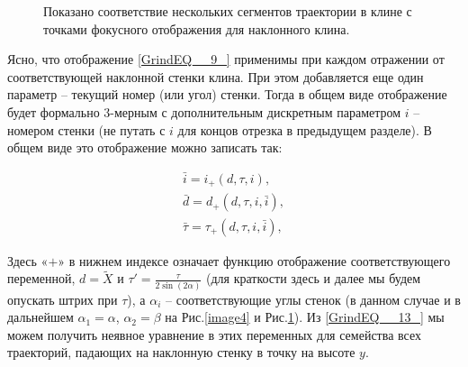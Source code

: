 \documentclass[a4paper]{article}
\begin{document}
\begin{figure}[h]
\caption{Показано соответствие нескольких сегментов траектории в клине с точками фокусного отображения для наклонного клина. }
\label{image10}
\end{figure}


Ясно, что отображение \eqref{GrindEQ__9_} 
 применимы при каждом отражении от соответствующей наклонной стенки клина. При этом добавляется еще один параметр -- текущий номер (или угол) стенки. Тогда в общем виде отображение будет формально 3-мерным с дополнительным дискретным параметром $i$ -- номером стенки (не путать с $i$ для концов отрезка в предыдущем разделе). В общем виде это отображение можно записать так:

\begin{equation} \label{GrindEQ__20_}
 \begin{array}{l}
  {\bar{i}=i_{+} \left(d,\tau ,i\right),} \\ {\bar{d}=d_{+} \left(d,\tau ,i,\bar{i}\right),} \\ {\bar{\tau }=\tau _{+} \left(d,\tau ,i,\bar{i}\right),}
   \end{array}
    \end{equation}

Здесь «$+$» в нижнем индексе означает функцию отображение соответствующего переменной, $d =\tilde{X} $ и $\tau '=\frac{\tau }{2 \sin (2 \alpha )}$ (для краткости здесь и далее мы будем опускать штрих при $\tau$), а $\alpha _{i} $ -- соответствующие углы стенок (в данном случае и в дальнейшем $\alpha _{1} =\alpha$, $\alpha _{2} =\beta $ на Рис.\ref{image4} и Рис.\ref{image10}).
Из \eqref{GrindEQ__13_} мы можем получить неявное уравнение в этих переменных для семейства всех траекторий, падающих на наклонную стенку в точку на высоте $y$.
\end{document}
